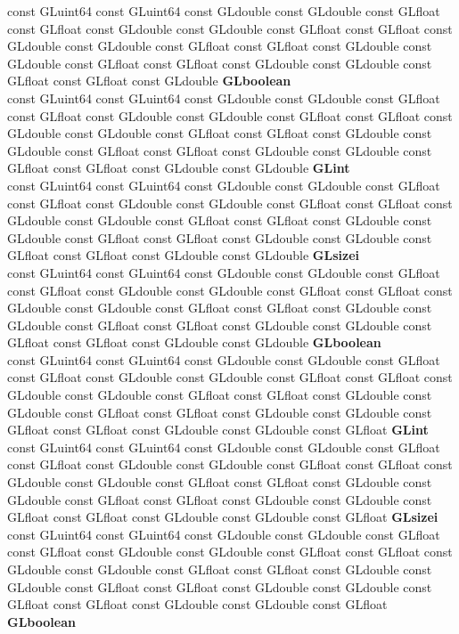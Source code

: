 \begin{DoxyCompactItemize}
\begin{tabbing}
\>const GLuint64 const GLuint64 const GLdouble const GLdouble const GLfloat const GLfloat const GLdouble const GLdouble const GLfloat const GLfloat const GLdouble const GLdouble const GLfloat const GLfloat const GLdouble const GLdouble const GLfloat const GLfloat const GLdouble const GLdouble const GLfloat const GLfloat const GLdouble {\bfseries GLboolean}\\
\>const GLuint64 const GLuint64 const GLdouble const GLdouble const GLfloat const GLfloat const GLdouble const GLdouble const GLfloat const GLfloat const GLdouble const GLdouble const GLfloat const GLfloat const GLdouble const GLdouble const GLfloat const GLfloat const GLdouble const GLdouble const GLfloat const GLfloat const GLdouble const GLdouble {\bfseries GLint}\\
\>const GLuint64 const GLuint64 const GLdouble const GLdouble const GLfloat const GLfloat const GLdouble const GLdouble const GLfloat const GLfloat const GLdouble const GLdouble const GLfloat const GLfloat const GLdouble const GLdouble const GLfloat const GLfloat const GLdouble const GLdouble const GLfloat const GLfloat const GLdouble const GLdouble {\bfseries GLsizei}\\
\>const GLuint64 const GLuint64 const GLdouble const GLdouble const GLfloat const GLfloat const GLdouble const GLdouble const GLfloat const GLfloat const GLdouble const GLdouble const GLfloat const GLfloat const GLdouble const GLdouble const GLfloat const GLfloat const GLdouble const GLdouble const GLfloat const GLfloat const GLdouble const GLdouble {\bfseries GLboolean}\\
\>const GLuint64 const GLuint64 const GLdouble const GLdouble const GLfloat const GLfloat const GLdouble const GLdouble const GLfloat const GLfloat const GLdouble const GLdouble const GLfloat const GLfloat const GLdouble const GLdouble const GLfloat const GLfloat const GLdouble const GLdouble const GLfloat const GLfloat const GLdouble const GLdouble const GLfloat {\bfseries GLint}\\
\>const GLuint64 const GLuint64 const GLdouble const GLdouble const GLfloat const GLfloat const GLdouble const GLdouble const GLfloat const GLfloat const GLdouble const GLdouble const GLfloat const GLfloat const GLdouble const GLdouble const GLfloat const GLfloat const GLdouble const GLdouble const GLfloat const GLfloat const GLdouble const GLdouble const GLfloat {\bfseries GLsizei}\\
\>const GLuint64 const GLuint64 const GLdouble const GLdouble const GLfloat const GLfloat const GLdouble const GLdouble const GLfloat const GLfloat const GLdouble const GLdouble const GLfloat const GLfloat const GLdouble const GLdouble const GLfloat const GLfloat const GLdouble const GLdouble const GLfloat const GLfloat const GLdouble const GLdouble const GLfloat {\bfseries GLboolean}\\

\end{tabbing}
\end{DoxyCompactItemize}
